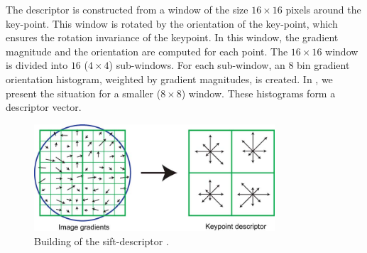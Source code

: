 The descriptor is constructed from a window of the size $16\times16$ pixels around the key-point. This window is rotated by the orientation of the key-point, which ensures the rotation invariance of the keypoint. In this window, the gradient magnitude and the orientation are computed for each point. The $16\times16$ window is divided into $16$ ($4\times4$) sub-windows. For each sub-window, an $8$ bin gradient orientation histogram, weighted by gradient magnitudes, is created. In , we present the situation for a smaller ($8\times8$) window. These histograms form a descriptor vector.

\begin{figure}
    \centering
    \includegraphics[width=0.8\textwidth]{Figures/sift/descriptor.jpg}
    \caption[Extracting the sift-descriptor.]{Building of the sift-descriptor \cite{Lowe2004}.}
    \label{fig:sift_descriptor}
\end{figure}
